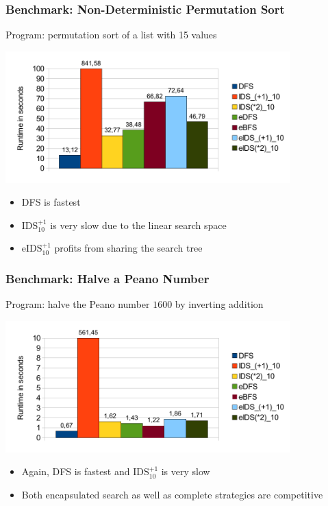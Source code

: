 \documentclass[
,hyperref={pdfpagelabels=false}
]{beamer}
\begin{document}
\begin{frame}%
\frametitle{Benchmark: Non-Deterministic Permutation Sort}
Program: permutation sort of a list with 15 values
\begin{center}
\includegraphics[width=11cm]{gfx/permsort}
\end{center}
\begin{itemize}
\item DFS is fastest
\item $\text{IDS}_{10}^{+1}$ is very slow due to the linear search space
\item $\text{eIDS}_{10}^{+1}$ profits from sharing the search tree
\end{itemize}
\end{frame}


\begin{frame}[fragile]%
\frametitle{Benchmark: Halve a Peano Number}
Program: halve the Peano number $1600$ by inverting addition
\begin{center}
\includegraphics[width=11cm]{gfx/half}
\end{center}
\begin{itemize}
\item Again, DFS is fastest and $\text{IDS}_{10}^{+1}$ is very slow
\item Both encapsulated search as well as complete strategies are
      competitive
\end{itemize}
\end{frame}
\end{document}
